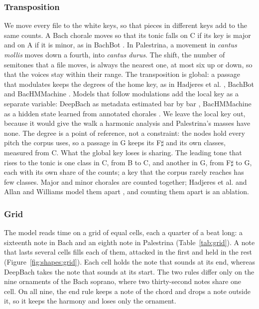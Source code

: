 \subsubsection{Transposition}
We move every file to the white keys, so that pieces in different keys add to the same counts. A Bach chorale moves so that its tonic falls on C if its key is major and on A if it is minor, as in BachBot \cite{liang2017}. In Palestrina, a movement in \emph{cantus mollis} moves down a fourth, into \emph{cantus durus}. The shift, the number of semitones that a file moves, is always the nearest one, at most six up or down, so that the voices stay within their range. The transposition is global: a passage that modulates keeps the degrees of the home key, as in Hadjeres et al. \cite{hadjeres2016}, BachBot \cite{liang2017} and BacHMMachine \cite{zhu2021}. Models that follow modulations add the local key as a separate variable: DeepBach as metadata estimated bar by bar \cite{hadjeres2017}, BacHMMachine as a hidden state learned from annotated chorales \cite{zhu2021}. We leave the local key out, because it would give the walk a harmonic analysis and Palestrina's masses have none. The degree is a point of reference, not a constraint: the nodes hold every pitch the corpus uses, so a passage in G keeps its F$\sharp$ and its own classes, measured from C. What the global key loses is sharing. The leading tone that rises to the tonic is one class in C, from B to C, and another in G, from F$\sharp$ to G, each with its own share of the counts; a key that the corpus rarely reaches has few classes. Major and minor chorales are counted together; Hadjeres et al. and Allan and Williams model them apart \cite{hadjeres2016, allan2004}, and counting them apart is an ablation.

\subsubsection{Grid}
The model reads time on a grid of equal cells, each a quarter of a beat long: a sixteenth note in Bach and an eighth note in Palestrina (Table~\ref{tab:grid}). A note that lasts several cells fills each of them, attacked in the first and held in the rest (Figure~\ref{fig:shapes:grid}). Each cell holds the note that sounds at its end, whereas DeepBach \cite{hadjeres2017} takes the note that sounds at its start. The two rules differ only on the nine ornaments of the Bach soprano, where two thirty-second notes share one cell. On all nine, the end rule keeps a note of the chord and drops a note outside it, so it keeps the harmony and loses only the ornament.

